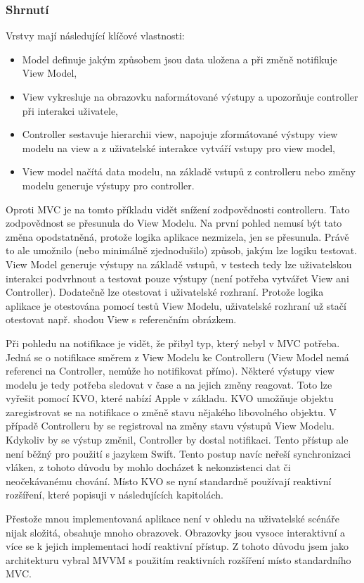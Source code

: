\subsubsection{Shrnutí} \label{architektura-mvvm-shrnuti}

Vrstvy mají následující klíčové vlastnosti:
\begin{itemize}
  \item Model definuje jakým způsobem jsou data uložena a při změně notifikuje View Model,
  \item View vykresluje na obrazovku naformátované výstupy a upozorňuje controller při interakci uživatele,
  \item Controller sestavuje hierarchii view, napojuje zformátované výstupy view modelu na view a z uživatelské interakce vytváří vstupy pro view model,
  \item View model načítá data modelu, na základě vstupů z controlleru nebo změny modelu generuje výstupy pro controller.
\end{itemize}

Oproti MVC je na tomto příkladu vidět snížení zodpovědnosti controlleru. Tato zodpovědnost se přesunula do View Modelu.
Na první pohled nemusí být tato změna opodstatněná, protože logika aplikace nezmizela, jen se přesunula.
Právě to ale umožnilo (nebo minimálně zjednodušilo) způsob, jakým lze logiku testovat.
View Model generuje výstupy na základě vstupů, v testech tedy lze uživatelskou interakci podvrhnout a testovat pouze výstupy (není potřeba vytvářet View ani Controller).
Dodatečně lze otestovat i uživatelské rozhraní.
Protože logika aplikace je otestována pomocí testů View Modelu, uživatelské rozhraní už stačí otestovat např. shodou View s referenčním obrázkem.

Při pohledu na notifikace je vidět, že přibyl typ, který nebyl v MVC potřeba.
Jedná se o notifikace směrem z View Modelu ke Controlleru (View Model nemá referenci na Controller, nemůže ho notifikovat přímo).
Některé výstupy view modelu je tedy potřeba sledovat v čase a na jejich změny reagovat.
Toto lze vyřešit pomocí KVO, které nabízí Apple v základu.
KVO umožňuje objektu zaregistrovat se na notifikace o změně stavu nějakého libovolného objektu.
V případě Controlleru by se registroval na změny stavu výstupů View Modelu.
Kdykoliv by se výstup změnil, Controller by dostal notifikaci.
Tento přístup ale není běžný pro použití s jazykem Swift.
Tento postup navíc neřeší synchronizaci vláken, z tohoto důvodu by mohlo docházet k nekonzistenci dat či neočekávanému chování.
Místo KVO se nyní standardně používají reaktivní rozšíření, které popisuji v následujících kapitolách.

Přestože mnou implementovaná aplikace není v ohledu na uživatelské scénáře nijak složitá, obsahuje mnoho obrazovek.
Obrazovky jsou vysoce interaktivní a více se k jejich implementaci hodí reaktivní přístup.
Z tohoto důvodu jsem jako architekturu vybral MVVM s použitím reaktivních rozšíření místo standardního MVC.
